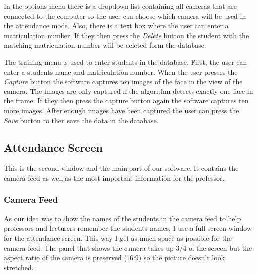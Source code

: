 \documentclass[12pt, a4paper]{article}
\begin{document}
In the options menu there is a dropdown list containing all cameras that are connected to the computer so the user can choose which camera will be used in the attendance mode. Also, there is a text box where the user can enter a matriculation number. If they then press the \textit{Delete} button the student with the matching matriculation number will be deleted form the database. 

The training menu is used to enter students in the database. First, the user can enter a students name and matriculation number.  When the user presses the \textit{Capture} button the software captures ten images of the face in the view of the camera. The images are only captured if the algorithm detects exactly one face in the frame. If they then press the capture button again the software captures ten more images. After enough images have been captured the user can press the \textit{Save} button to then save the data in the database. 

\subsection{Attendance Screen}
This is the second window and the main part of our software. It contains the camera feed as well as the most important information for the professor.

\subsubsection{Camera Feed}
As our idea was to show the names of the students in the camera feed to help professors and lecturers remember the students names, I use a full screen window for the attendance screen. This way I get as much space as possible for the camera feed. The panel that shows the camera takes up 3/4 of the screen but the aspect ratio of the camera is preserved (16:9) so the picture doesn’t look stretched.
 
\end{document}
